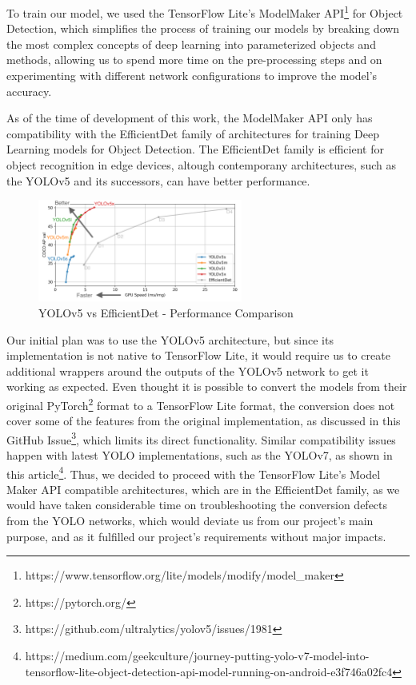 \documentclass[openright]{normas-utf-tex} %
\begin{document}
To train our model, we used the TensorFlow Lite's ModelMaker API\footnote{https://www.tensorflow.org/lite/models/modify/model\_maker} 
for Object Detection, which simplifies the process of training our models by breaking down the most
complex concepts of deep learning into parameterized objects and methods, allowing us to spend
more time on the pre-processing steps and on experimenting with different network configurations
to improve the model's accuracy. 

As of the time of development of this work, the ModelMaker API only has compatibility with the 
EfficientDet family of architectures\cite{Mingxing2020}
for training Deep Learning models for Object Detection. 
The EfficientDet family is efficient for object recognition in edge devices, altough contemporany 
architectures, such as the YOLOv5 and its successors, can have better performance.

\begin{figure}[H]
	\centering
	\includegraphics[width=0.6\textwidth]{./images/yolo-efficientdet-comparison.png}
	\caption[YOLOv5 vs EfficientDet - Performance Comparison]{YOLOv5 vs EfficientDet - Performance Comparison}
    \label{fig:diff}
\end{figure}

Our initial plan was to use the YOLOv5 architecture, but since its implementation is not native
to TensorFlow Lite, it would require us to create additional wrappers around the outputs of the YOLOv5
network to get it working as expected. Even thought it is possible to convert the models from their
original PyTorch\footnote{https://pytorch.org/} format to a TensorFlow Lite format, the conversion does
not cover some of the features from the original implementation, as discussed in this GitHub Issue\footnote{https://github.com/ultralytics/yolov5/issues/1981},
which limits its direct functionality.
Similar compatibility issues happen with latest YOLO implementations, such as the YOLOv7, 
as shown in this article\footnote{https://medium.com/geekculture/journey-putting-yolo-v7-model-into-tensorflow-lite-object-detection-api-model-running-on-android-e3f746a02fc4}. 
Thus, we decided to proceed with the TensorFlow Lite's Model Maker API compatible architectures, 
which are in the EfficientDet family, as we would have taken considerable time on troubleshooting 
the conversion defects from the YOLO networks, which would deviate us from our project's main purpose,
and as it fulfilled our project's requirements without major impacts. 
\end{document}
